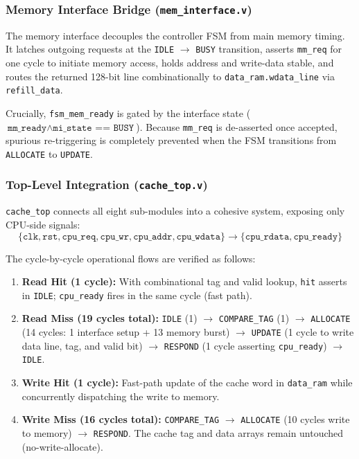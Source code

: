 \subsubsection{Memory Interface Bridge (\texttt{mem\_interface.v})}
The memory interface decouples the controller FSM from main memory timing. It
latches outgoing requests at the \texttt{IDLE} $\to$ \texttt{BUSY} transition,
asserts \texttt{mm\_req} for one cycle to initiate memory access, holds address
and write-data stable, and routes the returned 128-bit line combinationally
to \texttt{data\_ram.wdata\_line} via \texttt{refill\_data}.

Crucially, \texttt{fsm\_mem\_ready} is gated by the interface state
($\texttt{mm\_ready} \wedge \texttt{mi\_state == BUSY}$). Because \texttt{mm\_req}
is de-asserted once accepted, spurious re-triggering is completely prevented
when the FSM transitions from \texttt{ALLOCATE} to \texttt{UPDATE}.

\subsubsection{Top-Level Integration (\texttt{cache\_top.v})}
\texttt{cache\_top} connects all eight sub-modules into a cohesive system,
exposing only CPU-side signals:
\begin{equation}
    \{\texttt{clk}, \texttt{rst}, \texttt{cpu\_req}, \texttt{cpu\_wr}, \texttt{cpu\_addr}, \texttt{cpu\_wdata}\}
    \longrightarrow
    \{\texttt{cpu\_rdata}, \texttt{cpu\_ready}\}
\end{equation}

The cycle-by-cycle operational flows are verified as follows:
\begin{enumerate}
    \item \textbf{Read Hit (1 cycle):} With combinational tag and valid lookup,
        \texttt{hit} asserts in \texttt{IDLE}; \texttt{cpu\_ready} fires in the
        same cycle (fast path).
    \item \textbf{Read Miss (19 cycles total):} \texttt{IDLE} (1) $\to$
        \texttt{COMPARE\_TAG} (1) $\to$ \texttt{ALLOCATE} (14 cycles: 1 interface setup
        + 13 memory burst) $\to$ \texttt{UPDATE} (1 cycle to write data line, tag,
        and valid bit) $\to$ \texttt{RESPOND} (1 cycle asserting \texttt{cpu\_ready})
        $\to$ \texttt{IDLE}.
    \item \textbf{Write Hit (1 cycle):} Fast-path update of the cache word in
        \texttt{data\_ram} while concurrently dispatching the write to memory.
    \item \textbf{Write Miss (16 cycles total):} \texttt{COMPARE\_TAG} $\to$
        \texttt{ALLOCATE} (10 cycles write to memory) $\to$ \texttt{RESPOND}. The
        cache tag and data arrays remain untouched (no-write-allocate).
\end{enumerate}

